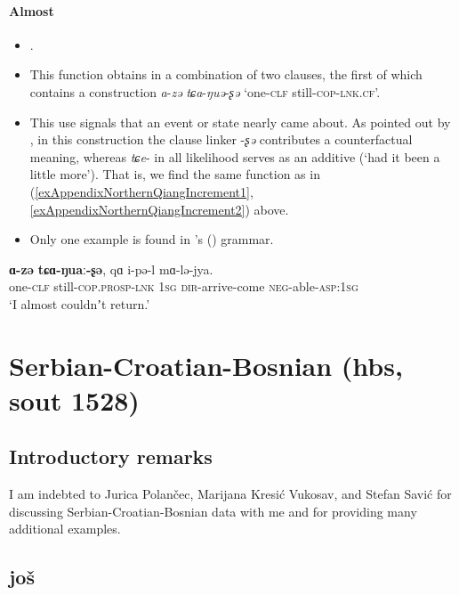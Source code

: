\paragraph{Almost}\label{appendixNorthernQiangAlmost}
\begin{itemize}
	\item \textcite[219–220]{LaPollaHuang2003}.
	\item This function obtains in a combination of two clauses, the first of which contains a construction \mbox{\textit{a}-\textit{zə}} \mbox{\textit{tɕa}-\textit{ŋuə}-\textit{ʂə}} \lq one-\textsc{clf} still-\textsc{cop}-\textsc{lnk}.\textsc{cf}'.
	\item This use signals that an event or state nearly came about. As pointed out by \textcite[220]{LaPollaHuang2003}, in this construction the clause linker \mbox{-\textit{ʂə}} contributes a counterfactual meaning, whereas \mbox{\textit{tɕe}-} in all likelihood serves as an additive (\lq had it been a little more'). That is, we find the same function as in (\ref{exAppendixNorthernQiangIncrement1}, \ref{exAppendixNorthernQiangIncrement2}) above.
	\item Only one example is found in \citeauthor{LaPollaHuang2003}'s (\citeyear{LaPollaHuang2003}) grammar.
\end{itemize}
\begin{exe}
	\ex
	\gll \textbf{ɑ-zə} \textbf{tɕɑ-ŋuaː-ʂə}, qɑ i-pə-l mɑ-lə-jya.\\
	one-\textsc{clf} still-\textsc{cop}.\textsc{prosp}-\textsc{lnk} 1\textsc{sg} \textsc{dir}-arrive-come \textsc{neg}-able-\textsc{asp}:1\textsc{sg}\\
	\glt \lq I almost couldnʼt return.' \parencite[219]{LaPollaHuang2003}
\end{exe}

\section{Serbian-Croatian-Bosnian (hbs, sout 1528)}
\label{appendixBCMS}
\subsection{Introductory remarks}
I am indebted to Jurica Polančec, Marijana Kresić Vukosav, and Stefan Savić for discussing Serbian-Croatian-Bosnian data with me and for providing many additional examples.
\subsection{još}

